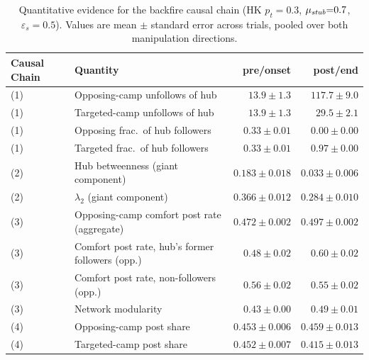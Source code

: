\documentclass[pdflatex,sn-mathphys-num]{sn-jnl}%
\theoremstyle{thmstyleone}%
\theoremstyle{thmstyletwo}%
\theoremstyle{thmstylethree}%
\def\Stubbornness{\mu_{\it stub}}
\def\ThofOpPreval{\varepsilon_s}
\begin{document}
\begin{table}[t]
  \tabcolsep=4pt
  \centering
  \caption{Quantitative evidence for the backfire causal chain (HK
  $p_t{=}0.3$, $\Stubbornness{=}0.7$, $\ThofOpPreval{=}0.5$). Values are mean
  $\pm$ standard error across trials, pooled over both manipulation directions.}
  \label{tab:mech_chain}
  \begin{tabular}{llrr}
    \toprule
    Causal Chain & Quantity & pre/onset & post/end \\
    \midrule
    (1) & Opposing-camp unfollows of hub      & $13.9 \pm 1.3$    & $117.7 \pm 9.0$  \\
    (1) & Targeted-camp unfollows of hub      & $13.9 \pm 1.3$    & $29.5 \pm 2.1$   \\
    (1) & Opposing frac.\ of hub followers    & $0.33 \pm 0.01$  & $0.00 \pm 0.00$  \\
    (1) & Targeted frac.\ of hub followers    & $0.33 \pm 0.01$  & $0.97 \pm 0.00$  \\
    \midrule
    (2) & Hub betweenness (giant component)     & $0.183 \pm 0.018$ & $0.033 \pm 0.006$ \\
    (2) & $\lambda_2$ (giant component)     & $0.366 \pm 0.012$ & $0.284 \pm 0.010$ \\
    \midrule
    (3) & Opposing-camp comfort post rate (aggregate)     & $0.472 \pm 0.002$ & $0.497 \pm 0.002$ \\
    (3) & Comfort post rate, hub's former followers (opp.)& $0.48 \pm 0.02$   & $0.60 \pm 0.02$   \\
    (3) & Comfort post rate, non-followers (opp.)         & $0.56 \pm 0.02$   & $0.55 \pm 0.02$   \\
    (3) & Network modularity                 & $0.43 \pm 0.00$   & $0.49 \pm 0.01$   \\
    \midrule
    (4) & Opposing-camp post share           & $0.453 \pm 0.006$ & $0.459 \pm 0.013$ \\
    (4) & Targeted-camp post share           & $0.452 \pm 0.007$ & $0.415 \pm 0.013$ \\
    \bottomrule
  \end{tabular}
\end{table}
\end{document}
